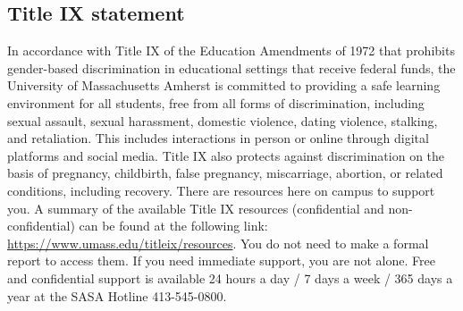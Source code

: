 \documentclass[11pt]{article}
\begin{document}
\subsection*{Title IX statement}
\label{sec:orge09d472}
In accordance with Title IX of the Education Amendments of 1972 that prohibits
gender-based discrimination in educational settings that receive federal funds,
the University of Massachusetts Amherst is committed to providing a safe
learning environment for all students, free from all forms of discrimination,
including sexual assault, sexual harassment, domestic violence, dating
violence, stalking, and retaliation. This includes interactions in person or
online through digital platforms and social media. Title IX also protects
against discrimination on the basis of pregnancy, childbirth, false pregnancy,
miscarriage, abortion, or related conditions, including recovery. There are
resources here on campus to support you. A summary of the available Title IX
resources (confidential and non-confidential) can be found at the following
link: \url{https://www.umass.edu/titleix/resources}. You do not need to make a formal
report to access them. If you need immediate support, you are not alone. Free
and confidential support is available 24 hours a day / 7 days a week / 365 days
a year at the SASA Hotline 413-545-0800.
\end{document}
